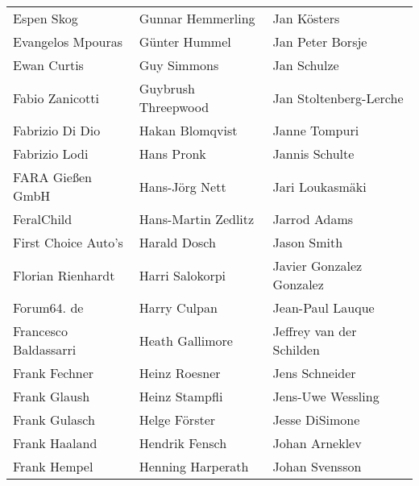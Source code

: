 \begin{tabular}{p{4.5cm}p{4.5cm}p{4.5cm}}
Espen Skog & Gunnar Hemmerling & Jan Kösters \\
Evangelos Mpouras & Günter Hummel & Jan Peter Borsje \\
Ewan Curtis & Guy Simmons & Jan Schulze \\
Fabio Zanicotti & Guybrush Threepwood & Jan Stoltenberg-Lerche \\
Fabrizio Di Dio & Hakan Blomqvist & Janne Tompuri \\
Fabrizio Lodi & Hans Pronk & Jannis Schulte \\
FARA Gießen GmbH & Hans-Jörg Nett & Jari Loukasmäki \\
FeralChild & Hans-Martin Zedlitz & Jarrod Adams \\
First Choice Auto's & Harald Dosch & Jason Smith \\
Florian Rienhardt & Harri Salokorpi & Javier Gonzalez Gonzalez \\
Forum64. de & Harry Culpan & Jean-Paul Lauque \\
Francesco Baldassarri & Heath Gallimore & Jeffrey van der Schilden \\
Frank Fechner & Heinz Roesner & Jens Schneider \\
Frank Glaush & Heinz Stampfli & Jens-Uwe Wessling \\
Frank Gulasch & Helge Förster & Jesse DiSimone \\
Frank Haaland & Hendrik Fensch & Johan Arneklev \\
Frank Hempel & Henning Harperath & Johan Svensson \\
\end{tabular}
\newpage
\setlength{\tabcolsep}{1mm}
